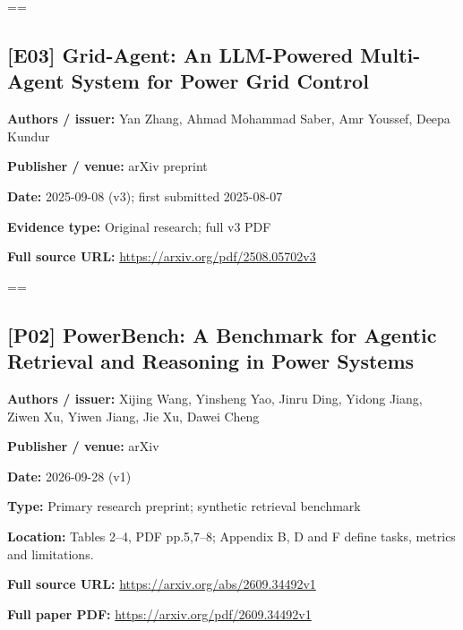 \documentclass[10pt,letterpaper]{article}
\begin{document}
\egroup\par\noindent\box\readingEntry\par\medskip
\setbox\readingEntry=\vbox\bgroup\hsize=\linewidth\subsection*{[E03] Grid-Agent: An LLM-Powered Multi-Agent System for Power Grid Control}
\textbf{Authors / issuer:} Yan Zhang, Ahmad Mohammad Saber, Amr Youssef, Deepa Kundur\par
\textbf{Publisher / venue:} arXiv preprint\par
\textbf{Date:} 2025-09-08 (v3); first submitted 2025-08-07\par
\textbf{Evidence type:} Original research; full v3 PDF\par
\textbf{Full source URL:} \href{https://arxiv.org/pdf/2508.05702v3}{\small\ttfamily https:/\allowbreak{}/\allowbreak{}arxiv.\allowbreak{}org/\allowbreak{}pdf/\allowbreak{}2508.\allowbreak{}05702v3}\par
\egroup\par\noindent\box\readingEntry\par\medskip
\setbox\readingEntry=\vbox\bgroup\hsize=\linewidth\subsection*{[P02] PowerBench: A Benchmark for Agentic Retrieval and Reasoning in Power Systems}
\textbf{Authors / issuer:} Xijing Wang, Yinsheng Yao, Jinru Ding, Yidong Jiang, Ziwen Xu, Yiwen Jiang, Jie Xu, Dawei Cheng\par
\textbf{Publisher / venue:} arXiv\par
\textbf{Date:} 2026-09-28 (v1)\par
\textbf{Type:} Primary research preprint; synthetic retrieval benchmark\par
\textbf{Location:} Tables 2--4, PDF pp.5,7--8; Appendix B, D and F define tasks, metrics and limitations.\par
\textbf{Full source URL:} \href{https://arxiv.org/abs/2609.34492v1}{\small\ttfamily https:/\allowbreak{}/\allowbreak{}arxiv.\allowbreak{}org/\allowbreak{}abs/\allowbreak{}2609.\allowbreak{}34492v1}\par
\textbf{Full paper PDF:} \href{https://arxiv.org/pdf/2609.34492v1}{\small\ttfamily https:/\allowbreak{}/\allowbreak{}arxiv.\allowbreak{}org/\allowbreak{}pdf/\allowbreak{}2609.\allowbreak{}34492v1}\par
\egroup\par\noindent\box\readingEntry\par\medskip
\end{document}

